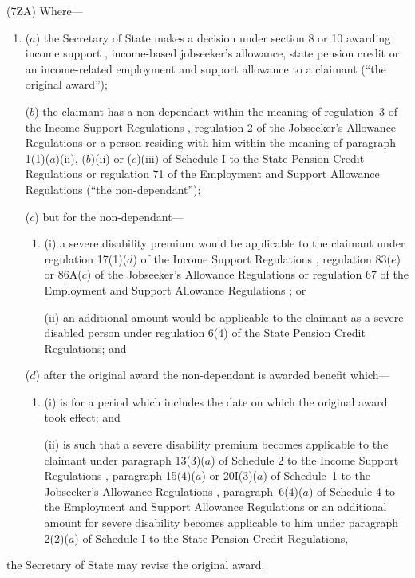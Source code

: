 \documentclass[12pt,a4paper]{article}
\begin{document}
(7ZA) Where—
\begin{enumerate}\item[]
($a$) the Secretary of State makes a decision under section 8 or 10 awarding income support%
, 
income-based jobseeker's allowance,  %
state pension credit or an income-related employment and support allowance  %
to a claimant (“the original award”);

($b$) the claimant has a non-dependant within the meaning of regulation~3 of the Income Support Regulations%
, regulation 2 of the Jobseeker’s Allowance Regulations  %
or a person residing with him within the meaning of paragraph 1(1)($a$)(ii), ($b$)(ii)  or ($c$)(iii)  of Schedule I to the State Pension Credit Regulations 
or regulation 71 of the Employment and Support Allowance Regulations  %
(“the non-dependant”);

($c$) but for the non-dependant—
\begin{enumerate}\item[]
(i) a severe disability premium would be applicable to the claimant under regulation 17(1)($d$)  of the Income Support Regulations%
, regulation 83($e$) or 86A($c$) of the Jobseeker’s Allowance Regulations  %
or regulation 67 of the Employment and Support Allowance Regulations%
; or

(ii)  an additional amount would be applicable to the claimant as a severe disabled person under regulation 6(4) of the State Pension Credit Regulations; and
\end{enumerate}

($d$) after the original award the non-dependant is awarded benefit which—
\begin{enumerate}\item[]
(i) is for a period which includes the date on which the original award took effect; and

(ii)  is such that a severe disability premium becomes applicable to the claimant under paragraph 13(3)($a$)  of Schedule 2 to the Income Support Regulations%
, paragraph 15(4)($a$) or 20I(3)($a$) of Schedule~1 to the Jobseeker’s Allowance Regulations%
, paragraph~6(4)($a$)  of Schedule 4 to the Employment and Support Allowance Regulations  %
or an additional amount for severe disability becomes applicable to him under paragraph 2(2)($a$)  of Schedule I to the State Pension Credit Regulations,
\end{enumerate}
\end{enumerate}
the Secretary of State may revise the original award.
\end{document}
